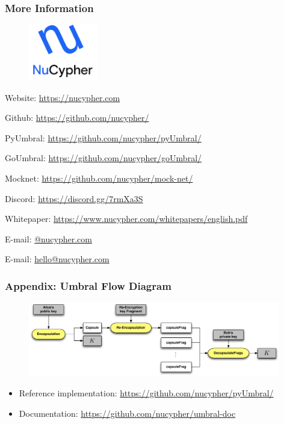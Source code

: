 \documentclass[xetex,mathsans,sans,aspectratio=169]{beamer}
\begin{document}
    \begin{frame}
        \frametitle{More Information}
        \begin{figure}
            \centering
            \includegraphics[width=3cm]{pdf/nucypher_logo.pdf}
        \end{figure}
        Website: \url{https://nucypher.com}

        Github: \url{https://github.com/nucypher/}

        PyUmbral: \url{https://github.com/nucypher/pyUmbral/}

        GoUmbral: \url{https://github.com/nucypher/goUmbral/}

        Mocknet: \url{https://github.com/nucypher/mock-net/}

        Discord: \url{https://discord.gg/7rmXa3S}

        Whitepaper: \url{https://www.nucypher.com/whitepapers/english.pdf}

        E-mail: \href{mailto:\emailname @nucypher.com}{\emailname @nucypher.com}

        E-mail: \href{mailto:hello@nucypher.com}{hello@nucypher.com}
    \end{frame}

    \begin{frame}
      \frametitle{Appendix: Umbral Flow Diagram}
      \begin{figure}
        \centering
        \includegraphics[width=11cm]{pdf/umbral-kem-flow.pdf}
      \end{figure}
      \begin{itemize}
           \item Reference implementation: \url{https://github.com/nucypher/pyUmbral/}
           \item Documentation: \url{https://github.com/nucypher/umbral-doc}
      \end{itemize}
    \end{frame}
\end{document}
